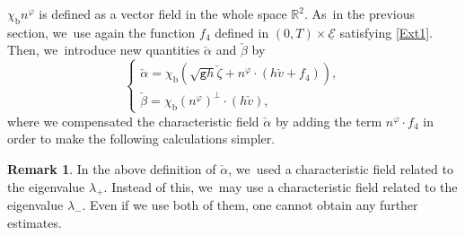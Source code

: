 \documentclass[10pt]{amsart}
\newcommand{\gr}{{\mathtt g}}
\newcommand{\R}{{\mathbb R}}
\newcommand{\cE}{{\mathcal E}}
\newcommand{\ul}[1]{\underline{#1}}
\theoremstyle{definition}
\newtheorem{remark}[theorem]{Remark}
\begin{document}
$\chi_\mathrm{b}n^\varphi$ is defined as a vector field in the whole space $\R^2$. As~in the previous section, we~use again the function $f_4$ defined in $(0,T)\times\ul{\cE}$ satisfying \eqref{Ext1}.
Then, we~introduce new quantities $\check{\alpha}$ and $\check{\beta}$ by
\begin{equation}\label{defCF}
\begin{cases}
\check{\alpha}=\chi_\mathrm{b}(\sqrt{\gr h}\check{\zeta} + n^\varphi\cdot(h\check{v}+f_4)), \\
\check{\beta}=\chi_\mathrm{b}(n^\varphi)^\perp\cdot(h\check{v}),
\end{cases}
\end{equation}
where we compensated the characteristic field $\check{\alpha}$ by adding the term $n^\varphi\cdot f_4$ in order to make the following calculations simpler.

\begin{remark}
In the above definition of $\check{\alpha}$, we~used a characteristic field related to the eigenvalue $\lambda_+$.
Instead of this, we~may use a characteristic field related to the eigenvalue $\lambda_-$.
Even if we use both of them, one cannot obtain any further estimates.
\end{remark}
\end{document}
